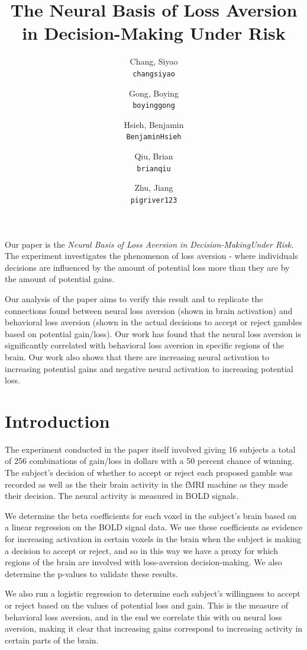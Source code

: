\documentclass[11pt]{article}
\title{The Neural Basis of Loss Aversion in Decision-Making Under Risk}
\author{
  Chang, Siyao \\
  \texttt{changsiyao}
  \and
  Gong, Boying\\
  \texttt{boyinggong}
  \and
  Hsieh, Benjamin\\
  \texttt{BenjaminHsieh}
  \and
  Qiu, Brian\\
  \texttt{brianqiu}
  \and
  Zhu, Jiang\\
  \texttt{pigriver123}
}
\begin{document}
\maketitle

\par Our paper is the \textit{Neural Basis of Loss Aversion in Decision-MakingUnder Risk}.
The experiment investigates the 
phenomenon of loss aversion - where individuals decisions are influenced by the
amount of potential loss more than they are by the amount of potential gains. 

\par 
Our analysis of the paper aims to verify this result and to replicate the connections found between neural loss aversion (shown in brain activation) and behavioral loss aversion (shown in the actual decisions to accept or reject gambles based on potential gain/loss). Our work has found that the neural loss aversion is significantly correlated with behavioral loss aversion in specific regions of the brain. Our work also shows that there are increasing neural activation to increasing potential gains and negative neural activation to increasing potential loss.

\section{Introduction}
The experiment conducted in the paper itself involved giving 16 subjects a total of 256 combinations of gain/loss in dollars with a 50 percent chance of winning. The subject's decision of whether to accept or reject each proposed gamble was recorded as well as the their brain activity in the fMRI machine as they made their decision. The neural activity is measured in BOLD signals.

\par 
We determine the beta coefficients for each voxel in the subject's brain based on a linear regression on the BOLD signal data. We use these coefficients as evidence for increasing activation in certain voxels in the brain when the subject is making a decision to accept or reject, and so in this way we have a proxy for which regions of the brain are involved with loss-aversion decision-making. We also determine the p-values to validate these results.

\par 
We also run a logistic regression to determine each subject's willingness to accept or reject based on the values of potential loss and gain. This is the measure of behavioral loss aversion, and in the end we correlate this with ou neural loss aversion, making it clear that increasing gains correspond to increasing activity in certain parts of the brain.  
\end{document}

